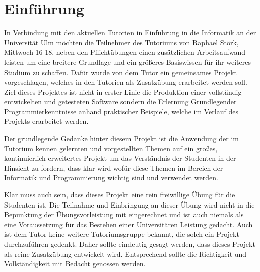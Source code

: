 \section{Einführung}
\label{ch:introduction}
In Verbindung mit den aktuellen Tutorien in Einführung in die Informatik an der Universität Ulm möchten die Teilnehmer des Tutoriums von Raphael Störk, Mittwoch 16-18, neben den Pflichtübungen einen zusätzlichen Arbeitsaufwand leisten um eine breitere Grundlage und ein größeres Basiswissen für ihr weiteres Studium zu schaffen. Dafür wurde von dem Tutor ein gemeinsames Projekt vorgeschlagen, welches in den Tutorien als Zusatzübung erarbeitet werden soll. Ziel dieses Projektes ist nicht in erster Linie die Produktion einer vollständig entwickelten und getesteten Software sondern die Erlernung Grundlegender Programmierkenntnisse anhand praktischer Beispiele, welche im Verlauf des Projekts erarbeitet werden.

Der grundlegende Gedanke hinter diesem Projekt ist die Anwendung der im Tutorium kennen gelernten und vorgestellten Themen auf ein großes, kontinuierlich erweitertes Projekt um das Verständnis der Studenten in der Hinsicht zu fordern, dass klar wird wofür diese Themen im Bereich der Informatik und Programmierung wichtig sind und verwendet werden.

Klar muss auch sein, dass dieses Projekt eine rein freiwillige Übung für die Studenten ist. Die Teilnahme und Einbringung an dieser Übung wird nicht in die Bepunktung der Übungsvorleistung mit eingerechnet und ist auch niemals als eine Voraussetzung für das Bestehen einer Universitären Leistung gedacht. Auch ist dem Tutor keine weitere Tutoriumsgruppe bekannt, die solch ein Projekt durchzuführen gedenkt. Daher sollte eindeutig gesagt werden, dass dieses Projekt als reine Zusatzübung entwickelt wird. Entsprechend sollte die Richtigkeit und Vollständigkeit mit Bedacht genossen werden.


